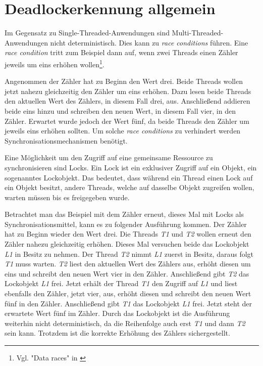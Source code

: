 \section{Deadlockerkennung allgemein}
\label{section:Deadlockerkennung allgemein}
Im Gegensatz zu Single-Threaded-Anwendungen sind Multi-Threaded-Anwendungen
nicht deterministisch. Dies kann zu \emph{race conditions} führen. Eine
\emph{race condition} tritt zum Beispiel dann auf, wenn zwei Threads einen
Zähler jeweils um eins erhöhen wollen\footnote{Vgl. "Data races" in
\autocite[70]{netzer1992race}}.

Angenommen der Zähler hat zu Beginn den Wert drei. Beide Threads wollen jetzt
nahezu gleichzeitig den Zähler um eins erhöhen. Dazu lesen beide Threads den
aktuellen Wert des Zählers, in diesem Fall drei, aus. Anschließend addieren
beide eins hinzu und schreiben den neuen Wert, in diesem Fall vier, in den
Zähler. Erwartet wurde jedoch der Wert fünf, da beide Threads den Zähler um
jeweils eins erhöhen sollten. Um solche \emph{race conditions} zu verhindert
werden Synchronisationsmechanismen benötigt.

Eine Möglichkeit um den Zugriff auf eine gemeinsame Ressource zu synchronisieren
sind Locks. Ein Lock ist ein exklusiver Zugriff auf ein Objekt, ein sogenanntes
Lockobjekt. Das bedeutet, dass während ein Thread einen Lock auf ein Objekt
besitzt, andere Threads, welche auf dasselbe Objekt zugreifen wollen, warten
müssen bis es freigegeben wurde.

Betrachtet man das Beispiel mit dem Zähler erneut, dieses Mal mit Locks als
Synchronisationsmittel, kann es zu folgender Ausführung kommen. Der Zähler hat
zu Beginn wieder den Wert drei. Die Threads \emph{T1} und \emph{T2} wollen
erneut den Zähler nahezu gleichzeitig erhöhen. Dieses Mal versuchen beide das
Lockobjekt \emph{L1} in Besitz zu nehmen. Der Thread \emph{T2} nimmt
\emph{L1} zuerst in Besitz, daraus folgt \emph{T1} muss warten. \emph{T2}
liest den aktuellen Wert des Zählers aus, erhöht diesen um eins und schreibt den
neuen Wert vier in den Zähler. Anschließend gibt \emph{T2} das Lockobjekt
\emph{L1} frei. Jetzt erhält der Thread \emph{T1} den Zugriff auf \emph{L1} und
liest ebenfalls den Zähler, jetzt vier, aus, erhöht diesen und schreibt den
neuen Wert fünf in den Zähler. Anschließend gibt \emph{T1} das Lockobjekt
\emph{L1} frei. Jetzt steht der erwartete Wert fünf im Zähler. Durch das
Lockobjekt ist die Ausführung weiterhin nicht deterministisch, da die
Reihenfolge auch erst \emph{T1} und dann \emph{T2} sein kann. Trotzdem ist die
korrekte Erhöhung des Zählers sichergestellt.

